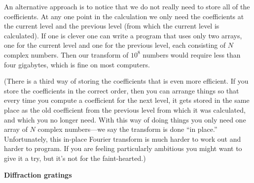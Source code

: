 \documentclass[12pt]{article}
\begin{document}
\begin{exercises}
An alternative approach is to notice that we do not really need to store
all of the coefficients.  At any one point in the calculation we only need
the coefficients at the current level and the previous level (from which
the current level is calculated).  If one is clever one can write a program
that uses only two arrays, one for the current level and one for the
previous level, each consisting of $N$ complex numbers.  Then our transform
of $10^8$ numbers would require less than four gigabytes, which is fine on
most computers.

(There is a third way of storing the coefficients that is even more
efficient.  If you store the coefficients in the correct order, then you
can arrange things so that every time you compute a coefficient for the
next level, it gets stored in the same place as the old coefficient from
the previous level from which it was calculated, and which you no longer
need.  With this way of doing things you only need one array of $N$ complex
numbers---we say the transform is done ``in place.''  Unfortunately,
this in-place Fourier transform is much harder to work out and harder to
program.  If you are feeling particularly ambitious you might want to give
it a try, but it's not for the faint-hearted.)



\exercise \textbf{Diffraction gratings}


\end{exercises}
\end{document}
